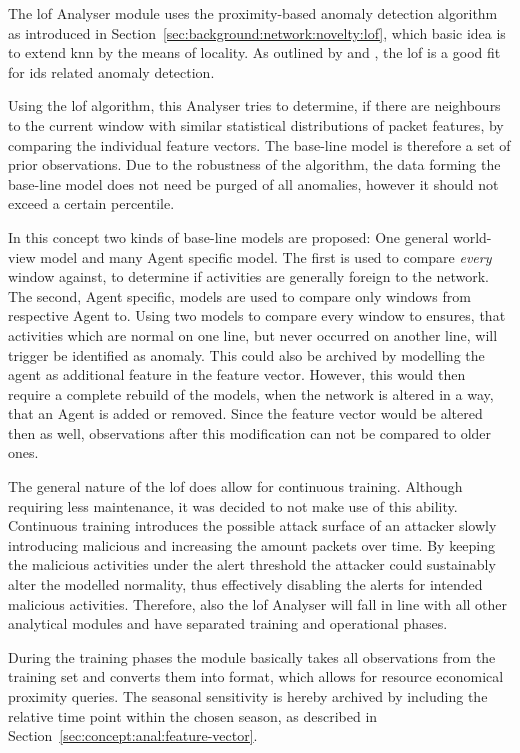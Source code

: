 The \gls{lof} Analyser module uses the proximity-based anomaly detection algorithm as introduced in Section~\ref{sec:background:network:novelty:lof}, which basic idea is to extend \gls{knn} by the means of locality.
As outlined by \textcite{Lazarevic2003} and \textcite{Zanero2004}, the \gls{lof} is a good fit for \gls{ids} related anomaly detection.

Using the \gls{lof} algorithm, this Analyser tries to determine, if there are neighbours to the current window with similar statistical distributions of packet features, by comparing the individual feature vectors.
The base-line model is therefore a set of prior observations.
Due to the robustness of the algorithm, the data forming the base-line model does not need be purged of all anomalies, however it should not exceed a certain percentile.

In this concept two kinds of base-line models are proposed: One general world-view model and many Agent specific model. 
The first is used to compare \emph{every} window against, to determine if activities are generally foreign to the network.
The second, Agent specific, models are used to compare only windows from respective Agent to.
Using two models to compare every window to ensures, that activities which are normal on one line, but never occurred on another line, will trigger be identified as anomaly. 
This could also be archived by modelling the agent as additional feature in the feature vector.
However, this would then require a complete rebuild of the models, when the network is altered in a way, that an Agent is added or removed. Since the feature vector would be altered then as well, observations after this modification can not be compared to older ones.

The general nature of the \gls{lof} does allow for continuous training. Although requiring less maintenance, it was decided to not make use of this ability. Continuous training introduces the possible attack surface of an attacker slowly introducing malicious and increasing the amount packets over time. By keeping the malicious activities under the alert threshold the attacker could sustainably alter the modelled normality, thus effectively disabling the alerts for intended malicious activities.
Therefore, also the \gls{lof} Analyser will fall in line with all other analytical modules and have separated training and operational phases.

During the training phases the module basically takes all observations from the training set and converts them into format, which allows for resource economical proximity queries. The seasonal sensitivity is hereby archived by including the relative time point within the chosen season, as described in Section~\ref{sec:concept:anal:feature-vector}.

